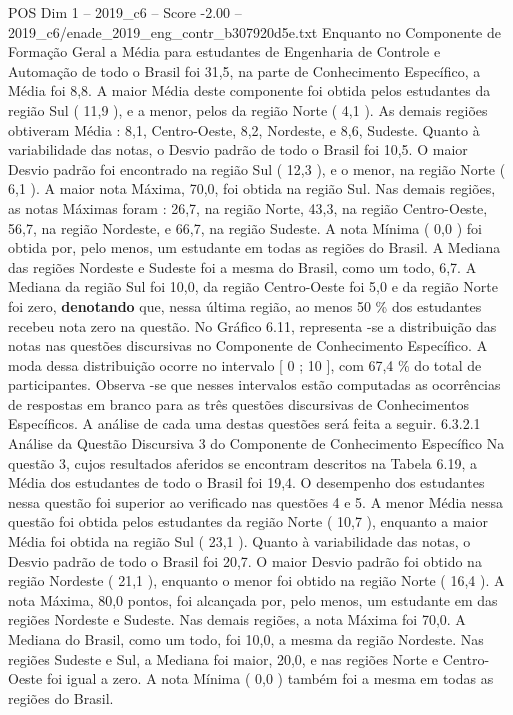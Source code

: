 \begin{textsample}{POS Dim 1 – 2019\_c6 – Score -2.00 – 2019\_c6/enade\_2019\_eng\_contr\_b307920d5e.txt}
Enquanto no Componente de Formação Geral a Média para estudantes de Engenharia de Controle e Automação de todo o Brasil foi 31,5, na parte de Conhecimento Específico, a Média foi 8,8.
A maior Média deste componente foi obtida pelos estudantes da região Sul ( 11,9 ), e a menor, pelos da região Norte ( 4,1 ).
As demais regiões obtiveram Média : 8,1, Centro-Oeste, 8,2, Nordeste, e 8,6, Sudeste.
Quanto à variabilidade das notas, o Desvio padrão de todo o Brasil foi 10,5.
O maior Desvio padrão foi encontrado na região Sul ( 12,3 ), e o menor, na região Norte ( 6,1 ).
A maior nota Máxima, 70,0, foi obtida na região Sul.
Nas demais regiões, as notas Máximas foram : 26,7, na região Norte, 43,3, na região Centro-Oeste, 56,7, na região Nordeste, e 66,7, na região Sudeste.
A nota Mínima ( 0,0 ) foi obtida por, pelo menos, um estudante em todas as regiões do Brasil.
A Mediana das regiões Nordeste e Sudeste foi a mesma do Brasil, como um todo, 6,7.
A Mediana da região Sul foi 10,0, da região Centro-Oeste foi 5,0 e da região Norte foi zero, \textbf{denotando} que, nessa última região, ao menos 50 \% dos estudantes recebeu nota zero na questão.
No Gráfico 6.11, representa -se a distribuição das notas nas questões discursivas no Componente de Conhecimento Específico.
A moda dessa distribuição ocorre no intervalo [ 0 ; 10 ], com 67,4 \% do total de participantes.
Observa -se que nesses intervalos estão computadas as ocorrências de respostas em branco para as três questões discursivas de Conhecimentos Específicos.
A análise de cada uma destas questões será feita a seguir. 6.3.2.1 Análise da Questão Discursiva 3 do Componente de Conhecimento Específico Na questão 3, cujos resultados aferidos se encontram descritos na Tabela 6.19, a Média dos estudantes de todo o Brasil foi 19,4.
O desempenho dos estudantes nessa questão foi superior ao verificado nas questões 4 e 5.
A menor Média nessa questão foi obtida pelos estudantes da região Norte ( 10,7 ), enquanto a maior Média foi obtida na região Sul ( 23,1 ).
Quanto à variabilidade das notas, o Desvio padrão de todo o Brasil foi 20,7.
O maior Desvio padrão foi obtido na região Nordeste ( 21,1 ), enquanto o menor foi obtido na região Norte ( 16,4 ).
A nota Máxima, 80,0 pontos, foi alcançada por, pelo menos, um estudante em das regiões Nordeste e Sudeste.
Nas demais regiões, a nota Máxima foi 70,0.
A Mediana do Brasil, como um todo, foi 10,0, a mesma da região Nordeste.
Nas regiões Sudeste e Sul, a Mediana foi maior, 20,0, e nas regiões Norte e Centro-Oeste foi igual a zero.
A nota Mínima ( 0,0 ) também foi a mesma em todas as regiões do Brasil.

\end{textsample}

